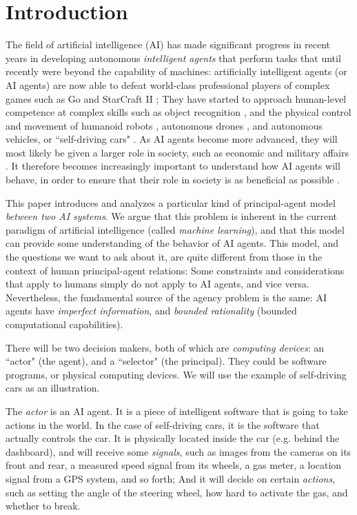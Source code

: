 \pagebreak
\section{Introduction}

The field of artificial intelligence (AI) has made significant progress in recent years in developing autonomous \textit{intelligent agents} that perform tasks that until recently were beyond the capability of machines: artificially intelligent agents (or AI agents) are now able to defeat world-class professional players of complex games such as Go \citep{Silver2016,Silver2017} and StarCraft II \citep{alphastarblog2019}; They have started to approach human-level competence at complex skills such as object recognition \citep{He2015}, and the physical control and movement of humanoid robots \citep{Andrychowicz2019}, autonomous drones \citep{Floreano2015}, and autonomous vehicles, or ``self-driving cars" \citep{Schwarting2018}. As AI agents become more advanced, they will most likely be given a larger role in society, such as economic and military affairs \citep{bostrom2014, Russell2015, Schwab2016}. It therefore becomes increasingly important to understand how AI agents will behave, in order to ensure that their role in society is as beneficial as possible \citep{Rahwan2019}. 

This paper introduces and analyzes a particular kind of principal-agent model \textit{between two AI systems}. We argue that this problem is inherent in the current paradigm of artificial intelligence (called \textit{machine learning}), and that this model can provide some understanding of the behavior of AI agents. This model, and the questions we want to ask about it, are quite different from those in the context of human principal-agent relations: Some constraints and considerations that apply to humans simply do not apply to AI agents, and vice versa. Nevertheless, the fundamental source of the agency problem is the same: AI agents have \textit{imperfect information}, and \textit{bounded rationality} (bounded computational capabilities).

There will be two decision makers, both of which are \textit{computing devices}: an ``actor" (the agent), and a ``selector" (the principal). They could be software programs, or physical computing devices. We will use the example of self-driving cars as an illustration.

The \textit{actor} is an AI agent. It is a piece of intelligent software that is going to take actions in the world. In the case of self-driving cars, it is the software that actually controls the car. It is physically located inside the car (e.g. behind the dashboard), and will receive some \textit{signals}, such as images from the cameras on its front and rear, a measured speed signal from its wheels, a gas meter, a location signal from a GPS system, and so forth; And it will decide on certain \textit{actions}, such as setting the angle of the steering wheel, how hard to activate the gas, and whether to break. 


